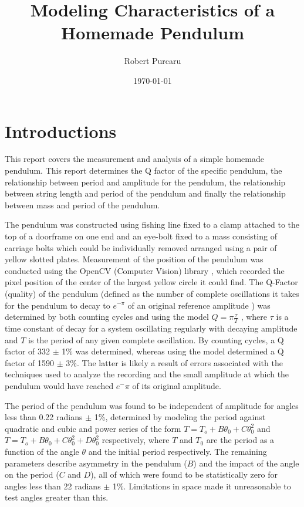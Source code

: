 \documentclass[11pt]{article}
\begin{document}
    \title{Modeling Characteristics of a Homemade Pendulum}
        \author{Robert Purcaru}
        \date{\today}
    \maketitle

    \tableofcontents

    \section{Introductions}
        This report covers the measurement and analysis of a simple homemade pendulum. This report determines the Q factor of the specific pendulum, the relationship between period and amplitude for the pendulum, the relationship between string length and period of the pendulum and finally the relationship between mass and period of the pendulum. 
        
        The pendulum was constructed using fishing line fixed to a clamp attached to the top of a doorframe on one end and an eye-bolt fixed to a mass consisting of carriage bolts which could be individually removed arranged using a pair of yellow slotted plates. Measurement of the position of the pendulum was conducted using the OpenCV (Computer Vision) library \cite{opencv_library}, which recorded the pixel position of the center of the largest yellow circle it could find. The Q-Factor (quality) of the pendulum (defined as the number of complete oscillations it takes for the pendulum to decay to $e^{-\pi}$ of an original reference amplitude \cite{labManual}) was determined by both counting cycles and using the model $Q = \pi\frac{\tau}{T}$ \cite{labManual}, where $\tau$ is a time constant of decay for a system oscillating regularly with decaying amplitude and $T$ is the period of any given complete oscillation. By counting cycles, a Q factor of 332 $\pm$ 1\% was determined, whereas using the model determined a Q factor of 1590 $\pm$ 3\%. The latter is likely a result of errors associated with the techniques used to analyze the recording and the small amplitude at which the pendulum would have reached $e^-\pi$ of its original amplitude. 
        
        The period of the pendulum was found to be independent of amplitude for angles less than 0.22 radians $\pm$ 1\%, determined by modeling the period against quadratic and cubic and power series of the form $T = T_{o} + B\theta_{0} + C\theta_{0}^{2}$ and $T = T_{o} + B\theta_{0} + C\theta_{0}^{2} + D\theta_{0}^2$ \cite{labManual} respectively, where $T$ and $T_0$ are the period as a function of the angle $\theta$ and the initial period respectively. The remaining parameters describe asymmetry in the pendulum ($B$) and the impact of the angle on the period ($C$ and $D$), all of which were found to be statistically zero for angles less than 22 radians $\pm$ 1\%. Limitations in space made it unreasonable to test angles greater than this. 
        
\end{document}
